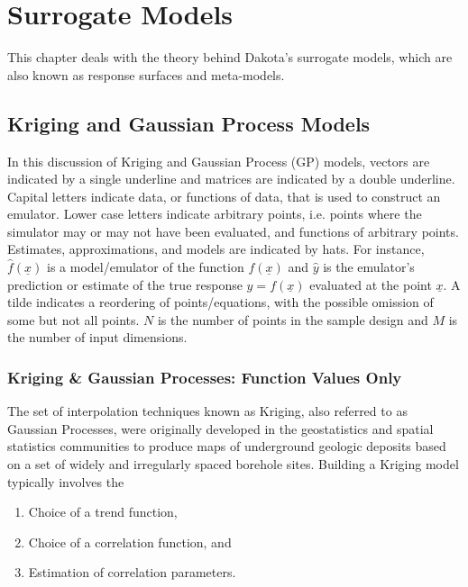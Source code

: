\chapter{Surrogate Models}\label{Chap:SurMod}
This chapter deals with the theory behind Dakota's surrogate models, which 
are also known as response surfaces and meta-models.

\section{Kriging and Gaussian Process Models}\label{Sec:KrigGP}

In this discussion of Kriging and Gaussian Process (GP) models, vectors are 
indicated by a single underline and matrices are indicated by a double 
underline.  Capital 
letters indicate data, or functions of data, that is used to construct 
an emulator.  Lower case letters indicate arbitrary points, i.e. points
 where the simulator may or may not have been evaluated, and functions 
of arbitrary points. Estimates, approximations, and models are indicated 
by hats.  For instance, $\hat{f}\left(\underline{x}\right)$ is a 
model/emulator of the function $f\left(\underline{x}\right)$ and 
$\hat{y}$ is the emulator's prediction or estimate of the true response 
$y=f(\underline{x})$ evaluated at the point $\underline{x}$.  A tilde 
indicates a reordering of points/equations, with the possible omission of 
some but not all points. $N$ is the number of points in the sample design 
and $M$ is the number of input dimensions.

\subsection{Kriging \& Gaussian Processes: Function Values Only}
\label{SubSec:KrigGP}
The set of interpolation techniques known as Kriging, also referred to 
as Gaussian Processes, were originally developed in the geostatistics 
and spatial statistics communities to produce maps of underground 
geologic deposits based on a set of widely and irregularly spaced 
borehole sites\cite{Cre91}. Building a Kriging
model typically involves the
\begin{enumerate}
\item Choice of a trend function,
\item Choice of a correlation function, and
\item Estimation of correlation parameters.
\end{enumerate}

